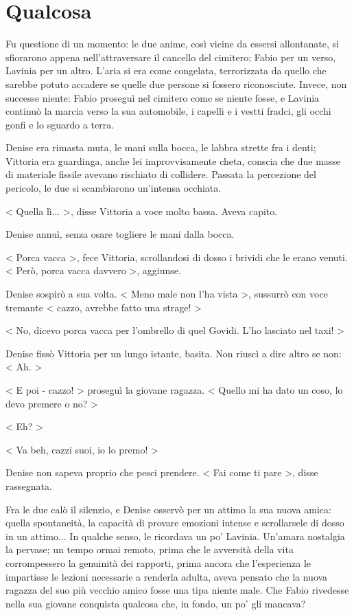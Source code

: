\chapter{Qualcosa}

Fu questione di un momento: le due anime, così vicine da essersi allontanate, si sfiorarono appena nell'attraversare il cancello del cimitero; Fabio per un verso, Lavinia per un altro. L'aria si era come congelata, terrorizzata da quello che sarebbe potuto accadere se quelle due persone si fossero riconosciute. Invece, non successe niente: Fabio proseguì nel cimitero come se niente fosse, e Lavinia continuò la marcia verso la sua automobile, i capelli e i vestti fradci, gli occhi gonfi e lo sguardo a terra.

Denise era rimasta muta, le mani sulla bocca, le labbra strette fra i denti; Vittoria era guardinga, anche lei improvvisamente cheta, conscia che due masse di materiale fissile avevano rischiato di collidere. Passata la percezione del pericolo, le due si scambiarono un'intensa occhiata.

< Quella lì... >, disse Vittoria a voce molto bassa. Aveva capito.

Denise annuì, senza osare togliere le mani dalla bocca.

< Porca vacca >, fece Vittoria, scrollandosi di dosso i brividi che le erano venuti. < Però, porca vacca davvero >, aggiunse.

Denise sospirò a sua volta. < Meno male non l'ha vista >, sussurrò con voce tremante < cazzo, avrebbe fatto una strage! >

< No, dicevo porca vacca per l'ombrello di quel Govidi. L'ho lasciato nel taxi! >

Denise fissò Vittoria per un lungo istante, basita. Non riuscì a dire altro se non: < Ah. >

< E poi - cazzo! > proseguì la giovane ragazza. < Quello mi ha dato un coso, lo devo premere o no? > 

< Eh? >

< Va beh, cazzi suoi, io lo premo! > 

Denise non sapeva proprio che pesci prendere. < Fai come ti pare >, disse rassegnata.

Fra le due calò il silenzio, e Denise osservò per un attimo la sua nuova amica: quella spontaneità, la capacità di provare emozioni intense e scrollarsele di dosso in un attimo... In qualche senso, le ricordava un po' Lavinia. Un'amara nostalgia la pervase; un tempo ormai remoto, prima che le avversità della vita corrompessero la genuinità dei rapporti, prima ancora che l'esperienza le impartisse le lezioni necessarie a renderla adulta, aveva pensato che la nuova ragazza del suo più vecchio amico fosse una tipa niente male. Che Fabio rivedesse nella sua giovane conquista qualcosa che, in fondo, un po' gli mancava?

